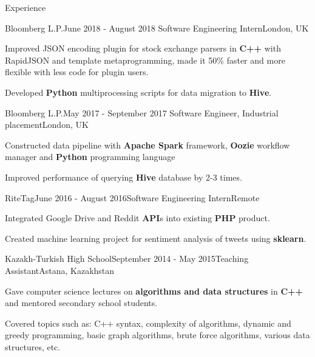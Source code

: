 \documentclass{resume}
\begin{document}
\begin{rSection}{Experience}
\begin{rSubsection}{Bloomberg L.P.}{June 2018 - August 2018}{ Software Engineering Intern}{London, UK}
\item Improved JSON encoding plugin for stock exchange parsers in \textbf{C++} with RapidJSON and template metaprogramming, made it 50\% faster and more flexible with less code for plugin users. 
\item Developed \textbf{Python} multiprocessing scripts for data migration to \textbf{Hive}.
\end{rSubsection}

\begin{rSubsection}{Bloomberg L.P.}{May 2017 - September 2017}{ Software Engineer, Industrial placement}{London, UK}
\item Constructed data pipeline with \textbf{Apache Spark} framework, \textbf{Oozie} workflow manager and \textbf{Python} programming language
\item Improved performance of querying  \textbf{Hive} database by 2-3 times.
\end{rSubsection}


\begin{rSubsection}{RiteTag}{June 2016 - August 2016}{Software Engineering Intern}{Remote}
\item Integrated Google Drive and Reddit \textbf{API}s into existing \textbf{PHP} product.
\item Created machine learning project for sentiment analysis of tweets using \textbf{sklearn}.
\end{rSubsection}


\begin{rSubsection}{Kazakh-Turkish High School}{September 2014 - May 2015}{Teaching Assistant}{Astana, Kazakhstan}
\item Gave computer science lectures on \textbf{algorithms and data structures} in \textbf{C++} and mentored secondary school students.
\item Covered topics such as: C++ syntax, complexity of algorithms, dynamic and greedy programming, basic graph algorithms, brute force algorithms, various data structures, etc.
\end{rSubsection}




\end{rSection}
\end{document}
